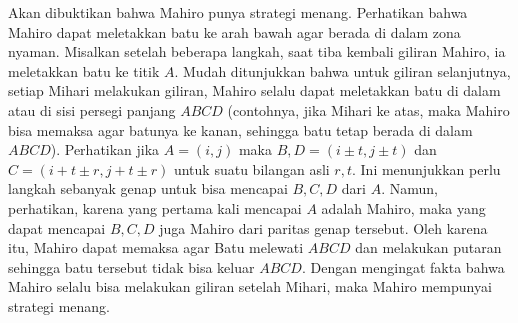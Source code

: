 \documentclass[12pt]{scrartcl}
\begin{document}
\begin{soaljawab}
\begin{solusi}
        Akan dibuktikan bahwa Mahiro punya strategi menang. Perhatikan bahwa Mahiro dapat meletakkan batu ke arah bawah agar berada di dalam zona nyaman. Misalkan setelah beberapa langkah, saat tiba kembali giliran Mahiro, ia meletakkan batu ke titik $A$. Mudah ditunjukkan bahwa untuk giliran selanjutnya, setiap  Mihari melakukan giliran, Mahiro selalu dapat meletakkan batu di dalam atau di sisi persegi panjang $ABCD$ (contohnya, jika Mihari ke atas, maka Mahiro bisa memaksa agar batunya ke kanan, sehingga batu tetap berada di dalam $ABCD$). Perhatikan jika $A=(i,j)$ maka $B,D = (i\pm t, j \pm t)$ dan $C=(i + t  \pm r, j + t \pm r)$ untuk suatu bilangan asli $r,t$. Ini menunjukkan perlu langkah sebanyak genap untuk bisa mencapai $B,C,D$ dari $A$. Namun, perhatikan, karena yang pertama kali mencapai $A$ adalah Mahiro, maka yang dapat mencapai $B,C,D$ juga Mahiro dari paritas genap tersebut. Oleh karena itu, Mahiro dapat memaksa agar Batu melewati $ABCD$ dan melakukan putaran sehingga batu tersebut tidak bisa keluar $ABCD$. Dengan mengingat fakta bahwa Mahiro selalu bisa melakukan giliran setelah Mihari, maka Mahiro mempunyai strategi menang.
    \end{solusi}
\end{soaljawab}
\end{document}
